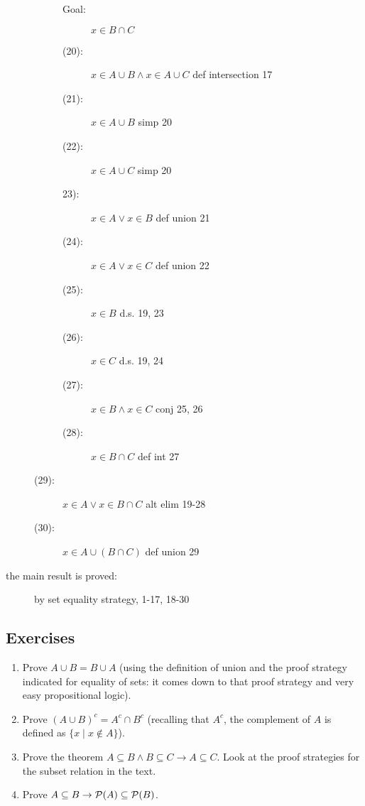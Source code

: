 \documentclass[12pt]{book}
\begin{document}
\begin{description}
\begin{description}
\begin{description}
\item[Goal:]  $x \in B \cap C$

\item[(20):]   $x \in A \cup B \wedge x \in A \cup C$  def intersection 17

\item[(21):]  $x \in A \cup B$ simp 20

\item[(22):]  $x \in A \cup C$  simp 20

\item[23):]  $x \in A \vee x \in B$  def union 21

\item[(24):]  $x \in A \vee x \in C$ def union 22

\item[(25):]  $x \in B$  d.s. 19, 23

\item[(26):]  $x \in C$  d.s. 19, 24

\item [(27):]  $x \in B \wedge x \in C$  conj 25, 26

\item[(28):]  $x \in B \cap C$  def int 27

\end{description}

\item[(29):]  $x \in A \vee x \in B \cap C$  alt elim 19-28

\item[(30):]  $x \in A \cup (B \cap C)$  def union 29

\end{description}

\item[the main result is proved:]  by set equality strategy, 1-17, 18-30

\end{description}

\newpage

\subsection{Exercises}

\begin{enumerate}

\item Prove $A \cup B = B \cup A$ (using the definition of union and the proof strategy indicated for equality of sets:  it comes down to that proof strategy and very easy propositional logic).

\item Prove $(A \cup B)^c = A^c \cap B^c$ (recalling that $A^c$, the complement of $A$ is defined as $\{x \mid x \not\in A\}$).

\item Prove the theorem $A \subseteq B \wedge B \subseteq C \rightarrow A \subseteq C$.  Look at the proof strategies for the subset relation in the text.

\item Prove $A \subseteq B \rightarrow {\cal P}(A) \subseteq {\cal P}(B)$.

\end{enumerate}
\end{document}
